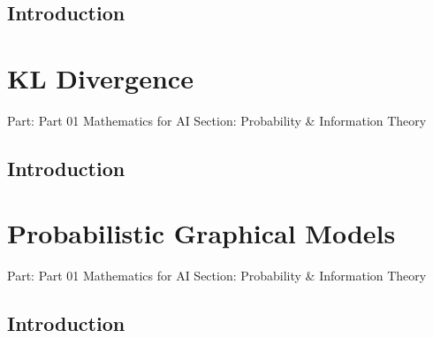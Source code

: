\documentclass[11pt,a4paper,twoside]{book}
\begin{document}
\hypertarget{introduction}{%
\subsection{Introduction}\label{introduction}}


\newpage

\hypertarget{kl-divergence}{%
\section{KL Divergence}\label{kl-divergence}}

Part: Part 01 Mathematics for AI Section: Probability \& Information
Theory

\hypertarget{introduction}{%
\subsection{Introduction}\label{introduction}}


\newpage

\hypertarget{probabilistic-graphical-models}{%
\section{Probabilistic Graphical
Models}\label{probabilistic-graphical-models}}

Part: Part 01 Mathematics for AI Section: Probability \& Information
Theory

\hypertarget{introduction}{%
\subsection{Introduction}\label{introduction}}


\newpage


\backmatter
\end{document}
